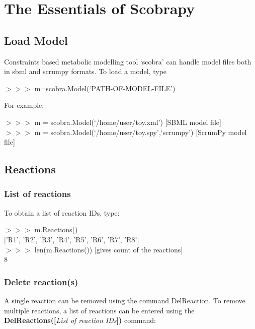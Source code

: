 \chapter{The Essentials of Scobrapy}

\section{Load Model}
Constraints based metabolic modelling tool `scobra' can handle model files both in sbml and scrumpy formats. To load a model, type

\begin{framed}
$>>>$ m=scobra.Model(`PATH-OF-MODEL-FILE')
\end{framed}

For example:

\begin{framed}
$>>>$ m = scobra.Model(`/home/user/toy.xml') [SBML model file]\\
$>>>$ m = scobra.Model(`/home/user/toy.spy',`scrumpy') [ScrumPy model file]
\end{framed}

\section{Reactions}
\subsection{List of reactions}
To obtain a list of reaction IDs, type:

\begin{framed}
$>>>$ m.Reactions()\\
$[$'R1', 'R2', 'R3', 'R4', 'R5', 'R6', 'R7', 'R8'$]$\\

$>>>$ len(m.Reactions()) [gives count of the reactions]\\
8 
\end{framed}
\subsection{Delete reaction(s)}
A single reaction can be removed using the command DelReaction. To remove multiple reactions, a list of reactions can be entered using the \textbf{DelReactions([}\textit{List of reaction IDs}\textbf{])} command:


